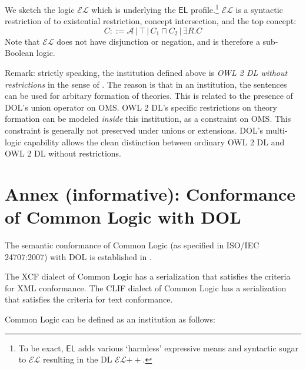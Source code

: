 \documentclass[10pt,fleqn,%
\ifpretendfinal
final%
\else
draft%
\fi,
]{scrreprt}
\newcommand{\EL}{\ensuremath{\mathsf{EL}}\xspace}
\newcommand{\ELDL}{\ensuremath{\mathcal{EL}}\xspace}
\newcommand{\nisref}[1]{#1}
\newcommand{\infannex}[1]{ \chapter{Annex (informative): #1} }
\begin{document}
\begin{definition}
We sketch the logic \ELDL which is underlying the \EL profile.\footnote{To be exact, \EL adds various `harmless' expressive means and syntactic sugar to \ELDL resulting in the DL \ELDL$++$. %
} 
\ELDL is a syntactic restriction of \ALC to existential restriction, concept
intersection, and the top concept:
$$C ::= {\mathcal A} \,|\, \top \,|\,  C_1 \sqcap C_2 \,|\, \exists R . C$$
Note that \ELDL does not have disjunction or negation, and is therefore a sub-Boolean logic.
\end{definition}

Remark: strictly speaking, the institution defined above is
\emph{{OWL} 2 DL without restrictions} in the sense of
\cite{DBLP:conf/owled/SchneiderRS13}. The reason is that in an
institution, the sentences can be used for arbitary formation of
theories. This is related to the presence of DOL's union operator on
OMS.  OWL 2 DL's specific restrictions on theory formation can be
modeled \emph{inside} this institution, as a constraint on OMS.  This
constraint is generally not preserved under unions or
extensions. DOL's multi-logic capability allows the clean distinction
between ordinary OWL 2 DL and {OWL} 2 DL without restrictions.


\infannex{Conformance of Common Logic with DOL}\label{a:cl}

The semantic conformance of Common Logic (as specified in \nisref{ISO/IEC 24707:2007}) with DOL is established in \cite{OntoGraph}.

The XCF dialect of Common Logic has a serialization that satisfies the criteria for XML conformance.  The CLIF dialect of Common Logic has a serialization that satisfies the criteria for text conformance.

Common Logic can be defined as an institution as follows:
\end{document}
